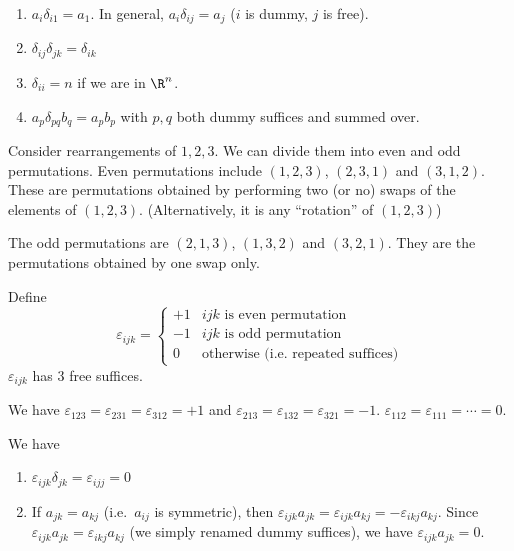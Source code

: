 \documentclass[a4paper]{article}
\begin{document}
\begin{eg}\leavevmode
  \begin{enumerate}
    \item $a_i\delta_{i1} = a_1$. In general, $a_i\delta_{ij} = a_j$ ($i$ is dummy, $j$ is free).
    \item $\delta_{ij}\delta_{jk} = \delta_{ik}$
    \item $\delta_{ii} = n$ if we are in $\R^n$.
    \item $a_p\delta_{pq}b_q = a_pb_p$ with $p, q$ both dummy suffices and summed over.
  \end{enumerate}
\end{eg}

\begin{defi}
  Consider rearrangements of $1, 2, 3$. We can divide them into even and odd permutations. Even permutations include $(1, 2, 3)$, $(2, 3, 1)$ and $(3, 1, 2)$. These are permutations obtained by performing two (or no) swaps of the elements of $(1, 2, 3)$. (Alternatively, it is any ``rotation'' of $(1, 2, 3)$)

  The odd permutations are $(2, 1, 3)$, $(1, 3, 2)$ and $(3, 2, 1)$. They are the permutations obtained by one swap only.

  Define
  \[
    \varepsilon_{ijk} =
    \begin{cases}
      +1 & ijk \text{ is even permutation}\\
      -1 & ijk\text{ is odd permutation}\\
      0 & \text{otherwise (i.e.\ repeated suffices)}
    \end{cases}
  \]
  $\varepsilon_{ijk}$ has 3 free suffices.

  We have $\varepsilon_{123} = \varepsilon_{231} = \varepsilon_{312} = +1$ and $\varepsilon_{213} = \varepsilon_{132} = \varepsilon_{321} = -1$. $\varepsilon_{112} = \varepsilon_{111} = \cdots = 0$.
\end{defi}

We have
\begin{enumerate}
  \item $\varepsilon_{ijk}\delta_{jk} = \varepsilon_{ijj} = 0$
  \item If $a_{jk} = a_{kj}$ (i.e.\ $a_{ij}$ is symmetric), then $\varepsilon_{ijk}a_{jk} = \varepsilon_{ijk}a_{kj} = -\varepsilon_{ikj}a_{kj}$. Since $\varepsilon_{ijk}a_{jk} = \varepsilon_{ikj}a_{kj}$ (we simply renamed dummy suffices), we have $\varepsilon_{ijk}a_{jk} = 0$.
\end{enumerate}
\end{document}
